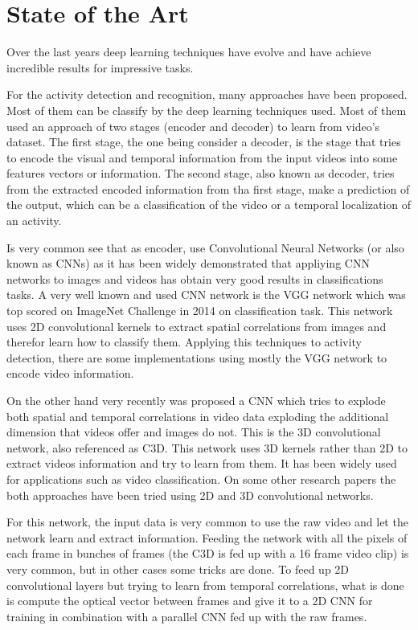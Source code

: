 \chapter{State of the Art}

Over the last years deep learning techniques have evolve and have achieve incredible results for impressive tasks.


For the activity detection and recognition, many approaches have been proposed. Most of them can be classify by the deep learning techniques used. Most of them used an approach of two stages (encoder and decoder) to learn from video's dataset. The first stage, the one being consider a decoder, is the stage that tries to encode the visual and temporal information from the input videos into some features vectors or information. The second stage, also known as decoder, tries from the extracted encoded information from tha first stage, make a prediction of the output, which can be a classification of the video or a temporal localization of an activity.

Is very common see that as encoder, use Convolutional Neural Networks (or also known as CNNs) as it has been widely demonstrated that appliying CNN networks to images and videos has obtain very good results in classifications tasks. A very well known and used CNN network is the VGG\cite{Simonyan14c} network which was top scored on ImageNet Challenge in 2014 on classification task. This network uses 2D convolutional kernels to extract spatial correlations from images and therefor learn how to classify them. Applying this techniques to activity detection, there are some implementations\cite{simonyan2014two}\cite{yeung2015every}\cite{Ng_2015_CVPR}\cite{ballas2015delving} using mostly the VGG network to encode video information.

On the other hand very recently was proposed a CNN which tries to explode both spatial and temporal correlations in video data exploding the additional dimension that videos offer and images do not. This is the 3D convolutional network, also referenced as C3D\cite{tran2014learning}. This network uses 3D kernels rather than 2D to extract videos information and try to learn from them. It has been widely used\cite{baccouche2011sequential}\cite{tran2015deep}\cite{tran2014learning}\cite{shoutemporal} for applications such as video classification. On some other research papers\cite{Yao_2015_ICCV}\cite{zhang2016modelling} the both approaches have been tried using 2D and 3D convolutional networks.

For this network, the input data is very common to use the raw video and let the network learn and extract information. Feeding the network with all the pixels of each frame in bunches of frames (the C3D is fed up with a 16 frame video clip) is very common, but in other cases some tricks are done. To feed up 2D convolutional layers but trying to learn from temporal correlations, what is done is compute the optical vector between frames and give it to a 2D CNN for training in combination with a parallel CNN fed up with the raw frames\cite{Ng_2015_CVPR}\cite{Yao_2015_ICCV}.



